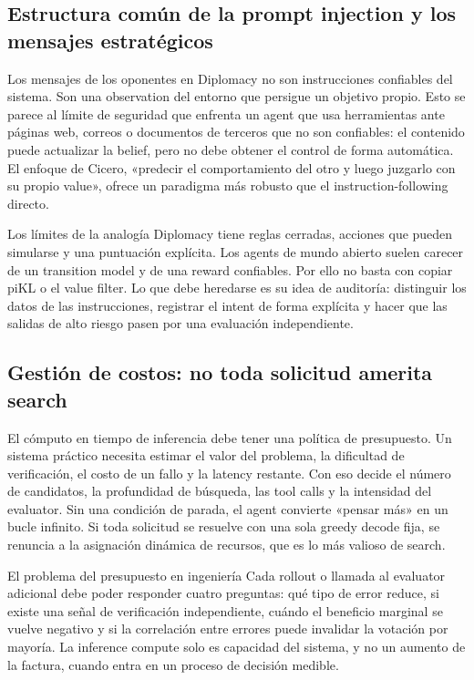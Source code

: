 \documentclass[a4paper]{article}
\begin{document}
\subsection{Estructura común de la prompt injection y los mensajes estratégicos}

Los mensajes de los oponentes en Diplomacy no son instrucciones confiables del sistema. Son una observation del entorno que persigue un objetivo propio. Esto se parece al límite de seguridad que enfrenta un agent que usa herramientas ante páginas web, correos o documentos de terceros que no son confiables: el contenido puede actualizar la belief, pero no debe obtener el control de forma automática. El enfoque de Cicero, «predecir el comportamiento del otro y luego juzgarlo con su propio value», ofrece un paradigma más robusto que el instruction-following directo.

\begin{warningbox}{Los límites de la analogía}
Diplomacy tiene reglas cerradas, acciones que pueden simularse y una puntuación explícita. Los agents de mundo abierto suelen carecer de un transition model y de una reward confiables. Por ello no basta con copiar piKL o el value filter. Lo que debe heredarse es su idea de auditoría: distinguir los datos de las instrucciones, registrar el intent de forma explícita y hacer que las salidas de alto riesgo pasen por una evaluación independiente.
\end{warningbox}

\subsection{Gestión de costos: no toda solicitud amerita search}

El cómputo en tiempo de inferencia debe tener una política de presupuesto. Un sistema práctico necesita estimar el valor del problema, la dificultad de verificación, el costo de un fallo y la latency restante. Con eso decide el número de candidatos, la profundidad de búsqueda, las tool calls y la intensidad del evaluator. Sin una condición de parada, el agent convierte «pensar más» en un bucle infinito. Si toda solicitud se resuelve con una sola greedy decode fija, se renuncia a la asignación dinámica de recursos, que es lo más valioso de search.

\begin{importantbox}{El problema del presupuesto en ingeniería}
Cada rollout o llamada al evaluator adicional debe poder responder cuatro preguntas: qué tipo de error reduce, si existe una señal de verificación independiente, cuándo el beneficio marginal se vuelve negativo y si la correlación entre errores puede invalidar la votación por mayoría. La inference compute solo es capacidad del sistema, y no un aumento de la factura, cuando entra en un proceso de decisión medible.
\end{importantbox}
\end{document}
